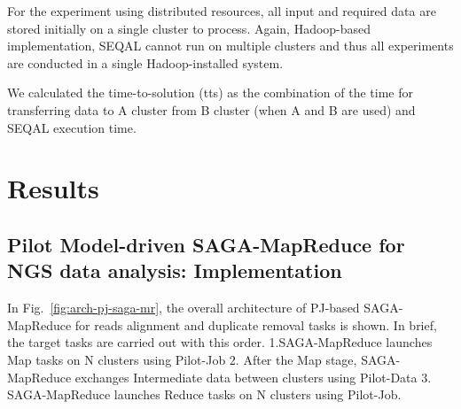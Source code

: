 \documentclass{sig-alternate}
\begin{document}
 
For the experiment using distributed resources, all input and required data are stored initially on a single cluster to process.  Again, Hadoop-based implementation, SEQAL cannot run on multiple clusters and thus all experiments are conducted in a single Hadoop-installed system.

We calculated the time-to-solution (tts) as the combination of the time for transferring data to A cluster from B cluster (when A and B are used) and SEQAL execution time. 
 


\section{Results}

\subsection{Pilot Model-driven SAGA-MapReduce for NGS data analysis: Implementation}
In Fig.~\ref{fig:arch-pj-saga-mr}, the overall architecture of PJ-based SAGA-MapReduce for reads alignment and duplicate removal tasks is shown.  In brief, the target tasks are carried out with this order. 1.SAGA-MapReduce launches Map tasks on N clusters using Pilot-Job 2. After the Map stage, SAGA-MapReduce exchanges Intermediate data between clusters using Pilot-Data  3. SAGA-MapReduce launches Reduce tasks on N clusters using Pilot-Job.
\end{document}
